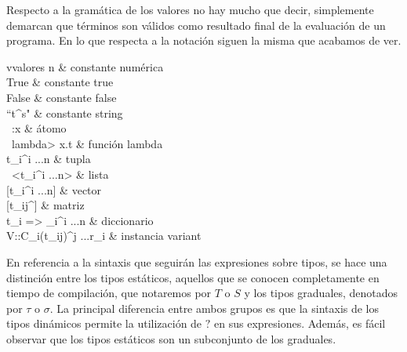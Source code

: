 Respecto a la gramática de los valores no hay mucho que decir, simplemente demarcan que términos son válidos como resultado final de la evaluación de un programa. En lo que respecta a la notación siguen la misma que acabamos de ver.\\

\smallskip
\hspace*{-2cm}
\begin{grammar}{v}{valores}
n             & constante numérica \\
True          & constante true \\
False          & constante false \\
``t^s"         & constante string \\
\ :x            & átomo \\
\ \<lambda> x.t     & función lambda \\
t_i^{i ...n} & tupla \\
\ <t_i^{i ...n}> & lista \\
{} [{t_i}^{i ...n}] & vector \\
{} [t_{ij}^{}] & matriz \\
{t_i => _i}^{i ...n} & diccionario\\
V::C_i(t_{ij})^{j ...r_i} & instancia variant \\
\end{grammar}
\smallskip

En referencia a la sintaxis que seguirán las expresiones sobre tipos, se hace una distinción entre los tipos estáticos, aquellos que se conocen completamente en tiempo de compilación, que notaremos por $T$ o $S$ y los tipos graduales, denotados por $\tau$ o $\sigma$. La principal diferencia entre ambos grupos es que la sintaxis de los tipos dinámicos permite la utilización de $?$ en sus expresiones. Además, es fácil observar que los tipos estáticos son un subconjunto de los graduales.\\

